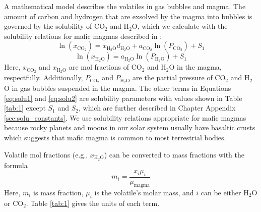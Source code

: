 A mathematical model describes the volatiles in gas bubbles and magma. The amount of carbon and hydrogen that are exsolved by the magma into bubbles is governed by the solubility of CO$_2$ and H$_2$O, which we calculate with the solubility relations for mafic magmas described in \citet{Iacono-Marziano_2012}:
\begin{equation}\label{eq:solu1}
    \ln ({x_{{\text{C}}{{\text{O}}_{\text{2}}}}}) = {x_{{{\text{H}}_{\text{2}}}{\text{O}}}}{d_{{{\text{H}}_{\text{2}}}{\text{O}}}} + {a_{{\text{C}}{{\text{O}}_{\text{2}}}}}\ln ({P_{{\text{C}}{{\text{O}}_{\text{2}}}}}) + S_1
\end{equation}
\begin{equation}\label{eq:solu2}
    \ln ({x_{{{\text{H}}_{\text{2}}}{\text{O}}}}) = {a_{{{\text{H}}_{\text{2}}}{\text{O}}}}\ln ({P_{{{\text{H}}_{\text{2}}}{\text{O}}}}) + {S_1}
\end{equation}
Here, $x_\mathrm{CO_2}$ and $x_\mathrm{H_2O}$ are mol fractions of CO$_2$ and H$_2$O in the magma, respectfully. Additionally, $P_\mathrm{CO_2}$ and $P_\mathrm{H_2O}$ are the partial pressure of CO$_2$ and H$_2$O in gas bubbles suspended in the magma. The other terms in Equations \eqref{eq:solu1} and \eqref{eq:solu2} are solubility parameters with values shown in Table \ref{tab:1} except $S_1$ and $S_2$, which are further described in Chapter Appendix \ref{sec:solu_constants}. We use solubility relations appropriate for mafic magmas because rocky planets and moons in our solar system usually have basaltic crusts which suggests that mafic magma is common to most terrestrial bodies.

Volatile mol fractions (e.g., $x_\mathrm{H_2O}$) can be converted to mass fractions with the formula
\begin{equation} \label{eq:convert}
    {m_i} = \frac{{x_i}{\mu_i}}{\mu_\mathrm{magma}}
\end{equation}
Here, $m_i$ is mass fraction, $\mu_i$ is the volatile's molar mass, and $i$ can be either H$_2$O or CO$_2$. Table \ref{tab:1} gives the units of each term. 

